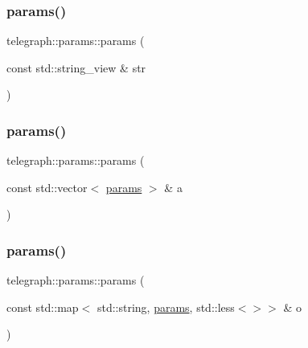 \mbox{\label{classtelegraph_1_1params_a062cab338a066baa48cbadaaa73cf463}} 
\subsubsection{\texorpdfstring{params()}{params()}\hspace{0.1cm}{\footnotesize\ttfamily [6/17]}}
{\footnotesize\ttfamily telegraph\+::params\+::params (\begin{DoxyParamCaption}\item[{const std\+::string\+\_\+view \&}]{str }\end{DoxyParamCaption})\hspace{0.3cm}{\ttfamily [inline]}}

\mbox{\label{classtelegraph_1_1params_a6636bd21082c7c08d825d83d6b480a68}} 
\subsubsection{\texorpdfstring{params()}{params()}\hspace{0.1cm}{\footnotesize\ttfamily [7/17]}}
{\footnotesize\ttfamily telegraph\+::params\+::params (\begin{DoxyParamCaption}\item[{const std\+::vector$<$ \hyperlink{classtelegraph_1_1params}{params} $>$ \&}]{a }\end{DoxyParamCaption})\hspace{0.3cm}{\ttfamily [inline]}}

\mbox{\label{classtelegraph_1_1params_ad32b25b3cbc41b7ae38edcd86ed47c37}} 
\subsubsection{\texorpdfstring{params()}{params()}\hspace{0.1cm}{\footnotesize\ttfamily [8/17]}}
{\footnotesize\ttfamily telegraph\+::params\+::params (\begin{DoxyParamCaption}\item[{const std\+::map$<$ std\+::string, \hyperlink{classtelegraph_1_1params}{params}, std\+::less$<$$>$$>$ \&}]{o }\end{DoxyParamCaption})\hspace{0.3cm}{\ttfamily [inline]}}

